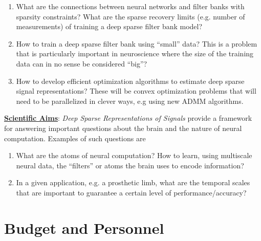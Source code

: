 \documentclass[12pt]{article}
\begin{document}
\begin{enumerate}
	\item What are the connections between neural networks and filter banks with sparsity constraints?  What are the sparse recovery limits (e.g. number of measurements) of training a deep sparse filter bank model?
	
	\item How to train a deep sparse filter bank using ``small'' data? This is a problem that is particularly important in neuroscience where the size of the training data can in no sense be considered ``big''?
	
	\item How to develop efficient optimization algorithms to estimate deep sparse signal representations? These will be convex optimization problems that will need to be parallelized in clever ways, e.g using new ADMM algorithms.	
	
\end{enumerate}

\noindent \textbf{\underline{Scientific Aims}}: \emph{Deep Sparse Representations of Signals} provide a framework for answering important questions about the brain and the nature of neural computation. Examples of such questions are
\begin{enumerate}
	\item What are the atoms of neural computation? How to learn, using multiscale neural data, the ``filters'' or atoms the brain uses to encode information?
	
	\item In a given application, e.g. a prosthetic limb, what are the temporal scales that are important to guarantee a certain level of performance/accuracy?

\end{enumerate}

\section*{Budget and Personnel}
\end{document}
